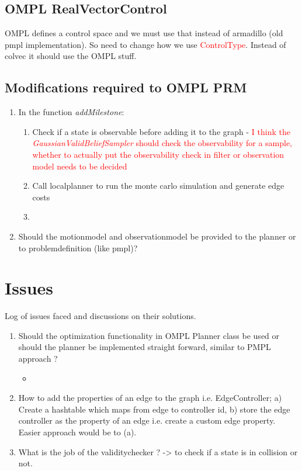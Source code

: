 \subsection{OMPL RealVectorControl}

OMPL defines a control space and we must use that instead of armadillo (old pmpl implementation). So need to change how we use \textcolor{red}{ControlType}.
Instead of colvec it should use the OMPL stuff.

\subsection{Modifications required to OMPL PRM}

\begin{enumerate}
 \item In the function \textit{addMilestone}:
  \begin{enumerate}
   \item Check if a state is observable before adding it to the graph - \textcolor{red}{I think the \textit{GaussianValidBeliefSampler} should check the observability for a sample, whether to actually put the observability check in filter or observation model needs to be decided} 
   \item Call localplanner to run the monte carlo simulation and generate edge costs
   \item 
  \end{enumerate}

  \item Should the motionmodel and observationmodel be provided to the planner or to problemdefinition (like pmpl)?
\end{enumerate}


\section{Issues}
Log of issues faced and discussions on their solutions.

\begin{enumerate}
 \item Should the optimization functionality in OMPL Planner class be used or should the planner be implemented straight forward, similar to PMPL approach ?
    \begin{itemize}
     \item 
    \end{itemize}
\item How to add the properties of an edge to the graph i.e. EdgeController; a) Create a hashtable which maps from edge to controller id, b) store the edge controller as the property of an edge i.e. create a custom edge property. Easier approach would be to (a).

 \item What is the job of the validitychecker ? -> to check if a state is in collision or not. 

\end{enumerate}

